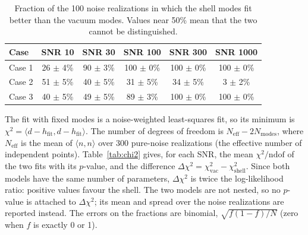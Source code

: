 \documentclass[11pt,a4paper]{article}
\begin{document}
\begin{table}[H]
\centering\small
\begin{tabular}{lccccc}
\toprule
Case & SNR 10 & SNR 30 & SNR 100 & SNR 300 & SNR 1000 \\
\midrule
Case 1 & 26 $\pm$ 4\% & 90 $\pm$ 3\% & 100 $\pm$ 0\% & 100 $\pm$ 0\% & 100 $\pm$ 0\% \\
Case 2 & 51 $\pm$ 5\% & 40 $\pm$ 5\% & 31 $\pm$ 5\% & 34 $\pm$ 5\% & 3 $\pm$ 2\% \\
Case 3 & 40 $\pm$ 5\% & 49 $\pm$ 5\% & 89 $\pm$ 3\% & 100 $\pm$ 0\% & 100 $\pm$ 0\% \\
\bottomrule
\end{tabular}
\caption{Fraction of the 100 noise realizations in which the shell modes fit better than the vacuum modes. Values near 50\% mean that the two cannot be distinguished.\label{tab:ligo}}
\end{table}

The fit with fixed modes is a noise-weighted least-squares fit, so its minimum is
$\chi^2=\langle d-h_\mathrm{fit},d-h_\mathrm{fit}\rangle$. The number of degrees of freedom is
$N_\mathrm{eff}-2N_\mathrm{modes}$, where $N_\mathrm{eff}$ is the mean of $\langle n,n\rangle$ over 300 pure-noise
realizations (the effective number of independent points). Table~\ref{tab:chi2} gives, for each SNR, the mean
$\chi^2/\mathrm{ndof}$ of the two fits with its $p$-value, and the difference $\Delta\chi^2=\chi^2_\mathrm{vac}-
\chi^2_\mathrm{shell}$. Since both models have the same number of parameters, $\Delta\chi^2$ is twice the
log-likelihood ratio: positive values favour the shell. The two models are not nested, so no $p$-value is attached
to $\Delta\chi^2$; its mean and spread over the noise realizations are reported instead. The errors on the
fractions are binomial, $\sqrt{f(1-f)/N}$ (zero when $f$ is exactly 0 or 1).
\end{document}

